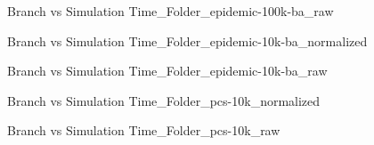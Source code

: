 \vspace{1cm}
\begin{figure}[H]
\centering

\caption{Branch vs Simulation Time\_Folder\_epidemic-100k-ba\_raw}
\end{figure}
\vspace{1cm}
\newpage
\begin{figure}[H]
\centering

\caption{Branch vs Simulation Time\_Folder\_epidemic-10k-ba\_normalized}
\end{figure}
\vspace{1cm}
\begin{figure}[H]
\centering

\caption{Branch vs Simulation Time\_Folder\_epidemic-10k-ba\_raw}
\end{figure}
\vspace{1cm}
\newpage
\begin{figure}[H]
\centering

\caption{Branch vs Simulation Time\_Folder\_pcs-10k\_normalized}
\end{figure}
\vspace{1cm}
\begin{figure}[H]
\centering

\caption{Branch vs Simulation Time\_Folder\_pcs-10k\_raw}
\end{figure}
\vspace{1cm}
\newpage

